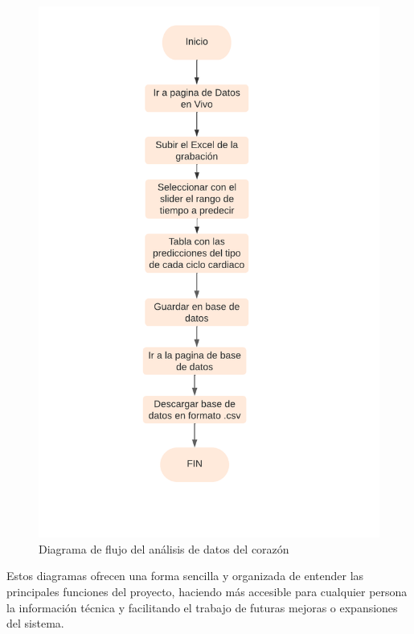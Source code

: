 \begin{figure}[h]
\centering
\includegraphics[width=\textwidth]{img/Diagramas/diagrama_analisis.png}
\caption{Diagrama de flujo del análisis de datos del corazón}
\label{fig:diagrama3}
\end{figure}

Estos diagramas ofrecen una forma sencilla y organizada de entender las principales funciones del proyecto, haciendo más accesible para cualquier persona la información técnica y facilitando el trabajo de futuras mejoras o expansiones del sistema.


